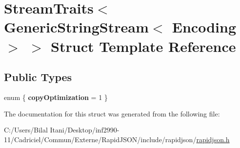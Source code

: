 \hypertarget{struct_stream_traits_3_01_generic_string_stream_3_01_encoding_01_4_01_4}{}\section{Stream\+Traits$<$ Generic\+String\+Stream$<$ Encoding $>$ $>$ Struct Template Reference}
\label{struct_stream_traits_3_01_generic_string_stream_3_01_encoding_01_4_01_4}
\subsection*{Public Types}
\begin{DoxyCompactItemize}
\item 
enum \{ {\bfseries copy\+Optimization} = 1
 \}\hypertarget{struct_stream_traits_3_01_generic_string_stream_3_01_encoding_01_4_01_4_adeb93fe42f819f86ffe3d85eca30a9f9}{}\label{struct_stream_traits_3_01_generic_string_stream_3_01_encoding_01_4_01_4_adeb93fe42f819f86ffe3d85eca30a9f9}

\end{DoxyCompactItemize}


The documentation for this struct was generated from the following file\+:\begin{DoxyCompactItemize}
\item 
C\+:/\+Users/\+Bilal Itani/\+Desktop/inf2990-\/11/\+Cadriciel/\+Commun/\+Externe/\+Rapid\+J\+S\+O\+N/include/rapidjson/\hyperlink{rapidjson_8h}{rapidjson.\+h}\end{DoxyCompactItemize}
